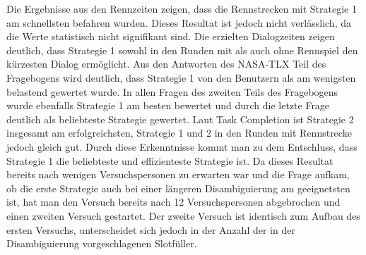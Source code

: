 \documentclass[12pt,a4paper]{scrartcl}
\begin{document}
Die Ergebnisse aus den Rennzeiten zeigen, dass die Rennstrecken mit Strategie 1 am schnellsten befahren wurden. Dieses Resultat ist jedoch nicht verlässlich, da die Werte statistisch nicht signifikant sind.
Die erzielten Dialogzeiten zeigen deutlich, dass Strategie 1 sowohl in den Runden mit als auch ohne Rennspiel den kürzesten Dialog ermöglicht. Aus den Antworten des NASA-TLX Teil des Fragebogens wird deutlich, dass Strategie 1 von den Benutzern als am wenigsten belastend gewertet wurde.  In allen Fragen des zweiten Teils des Fragebogens wurde ebenfalls Strategie 1 am besten bewertet und durch die letzte Frage deutlich als beliebteste Strategie gewertet. Laut Task Completion ist Strategie 2 insgesamt am erfolgreichsten, Strategie 1 und 2 in den Runden mit Rennstrecke jedoch gleich gut.
Durch diese Erkenntnisse kommt man zu dem Entschluss, dass Strategie 1 die beliebteste und effizienteste Strategie ist. \newline \newline
Da dieses Resultat bereits nach wenigen Versuchspersonen zu erwarten war und die Frage aufkam, ob die erste Strategie auch bei einer längeren Disambiguierung am geeignetsten ist, hat man den Versuch bereits nach 12 Versuchspersonen abgebrochen und einen zweiten Versuch gestartet. Der zweite Versuch ist identisch zum Aufbau des ersten Versuchs, unterscheidet sich jedoch in der Anzahl der in der Disambiguierung vorgeschlagenen Slotfüller. 
\end{document}
